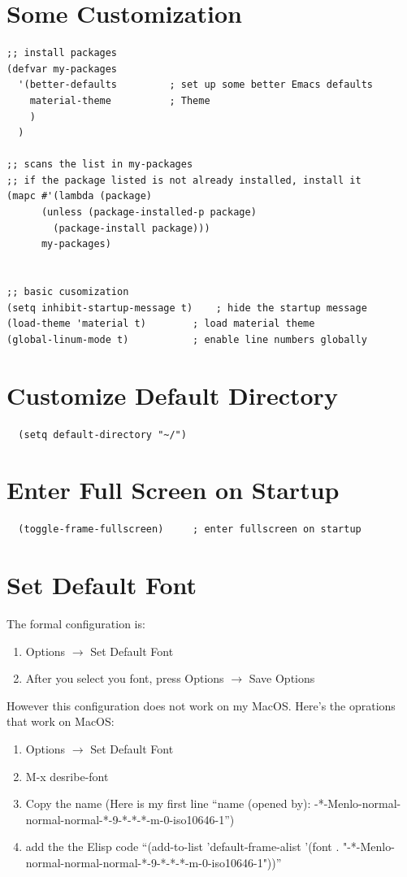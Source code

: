 \section{Some Customization}
\lstset{language=Lisp}
\begin{lstlisting}
;; install packages
(defvar my-packages
  '(better-defaults			; set up some better Emacs defaults
    material-theme			; Theme
    )
  )

;; scans the list in my-packages
;; if the package listed is not already installed, install it
(mapc #'(lambda (package)
	  (unless (package-installed-p package)
	    (package-install package)))
      my-packages)


;; basic cusomization
(setq inhibit-startup-message t)	; hide the startup message
(load-theme 'material t)		; load material theme
(global-linum-mode t)			; enable line numbers globally
\end{lstlisting}


\section{Customize Default Directory}
\lstset{language=Lisp}
\begin{lstlisting}
  (setq default-directory "~/")
\end{lstlisting}


\section{Enter Full Screen on Startup}

\begin{lstlisting}
  (toggle-frame-fullscreen)		; enter fullscreen on startup
\end{lstlisting}


\section{Set Default Font}

The formal configuration is:
\begin{enumerate}
\item Options $\rightarrow$ Set Default Font
\item After you select you font, press Options $\rightarrow$ Save Options
\end{enumerate}


However this configuration does not work on my MacOS.
Here's the oprations that work on MacOS:
\begin{enumerate}
\item Options $\rightarrow$ Set Default Font
\item M-x desribe-font
\item Copy the name (Here is my first line ``name (opened by): -*-Menlo-normal-normal-normal-*-9-*-*-*-m-0-iso10646-1'')
\item add the the Elisp code ``(add-to-list 'default-frame-alist '(font . "-*-Menlo-normal-normal-normal-*-9-*-*-*-m-0-iso10646-1"))''
\end{enumerate}

